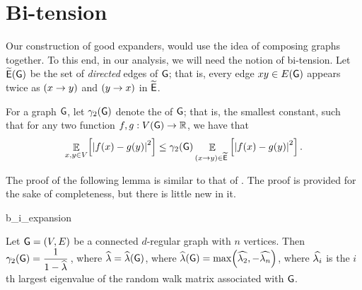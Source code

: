 %





\ChapterPrefix{}
\ChapterGen{}




\section{Bi-tension}

Our construction of good expanders, would use the idea of composing
graphs together. To this end, in our analysis, we will need the notion
of bi-tension. Let $\widetilde{\mathsf{E}}(\mathsf{G})$ be the set of \emph{directed}
edges of $\mathsf{G}$; that is, every edge $xy \in E(\mathsf{G})$ appears
twice as $\left({{x} \rightarrow {y}} \right)$ and $\left({{y} \rightarrow {x}} \right)$ in $\widetilde{\mathsf{E}}$.

\begin{defn}
    For a graph $\mathsf{G}$, let $\BiDialX{\Graph}$ denote the
     of $\mathsf{G}$; that is, the smallest constant,
    such that for any two function $f,g :V(\mathsf{G}) \rightarrow \mathbb{R}$,
    we have that
    \begin{align}
        \ExExt{x,y \in V}{\cardin{f(x)- g(y)}^2} \leq
        \BiDialX{\Graph} \ExExt{ \dirEdge{x}{y} \in \DEdges\;
        }{\cardin{f(x)- g(y)}^2}.
        \eqlab{b:i:tension}
    \end{align}
\end{defn}



The proof of the following lemma is similar to that of
.
The proof is provided for the sake of completeness, but there is
little new in it.

\begin{fragment}{b_i_expansion}
\begin{lemma}
    Let $\mathsf{G}=(V,E)$ be a connected $d$-regular graph with $n$
    vertices. Then $\ds \BiDialX{\Graph} = \frac{1}{1-\EVal}\,$, where
    $\widehat{\lambda} = \widehat{\lambda}(\mathsf{G})$, where $\EVal(\Graph) = \max\pth{\TEV{2},
       -\TEV{n} }$, where $\widehat{\lambda_{i}}$ is the $i$th largest eigenvalue of
    the random walk matrix associated with $\mathsf{G}$.

\end{lemma}
\end{fragment}

